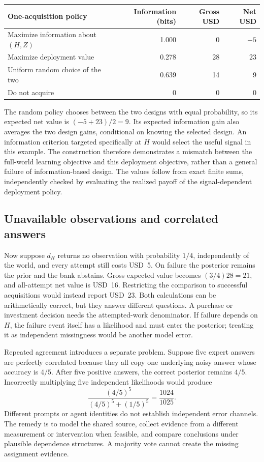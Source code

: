 \begin{center}
\begin{tabular}{lrrr}
\toprule
One-acquisition policy & Information (bits) & Gross USD & Net USD\\
\midrule
Maximize information about $(H,Z)$ & 1.000 & 0 & $-5$\\
Maximize deployment value & 0.278 & 28 & 23\\
Uniform random choice of the two & 0.639 & 14 & 9\\
Do not acquire & 0 & 0 & 0\\
\bottomrule
\end{tabular}
\end{center}

The random policy chooses between the two designs with equal probability,
so its expected net value is $(-5+23)/2=9$. Its expected information gain
also averages the two design gains, conditional on knowing the selected
design. An information criterion targeted specifically at $H$ would select
the useful signal in this example. The construction therefore demonstrates
a mismatch between the full-world learning objective and this deployment
objective, rather than a general failure of information-based design.
The values follow from exact finite sums, independently checked by evaluating
the realized payoff of the signal-dependent deployment policy.

\subsection{Unavailable observations and correlated answers}

Now suppose $d_H$ returns no observation with probability $1/4$, independently
of the world, and every attempt still costs USD~5. On failure the posterior
remains the prior and the bank abstains. Gross expected value becomes
$(3/4)28=21$, and all-attempt net value is USD~16. Restricting the comparison
to successful acquisitions would instead report USD~23. Both calculations
can be arithmetically correct, but they answer different questions. A purchase
or investment decision needs the attempted-work denominator. If failure
depends on $H$, the failure event itself has a likelihood and must enter the
posterior; treating it as independent missingness would be another model
error.

Repeated agreement introduces a separate problem. Suppose five expert
answers are perfectly correlated because they all copy one underlying noisy
answer whose accuracy is $4/5$. After five positive answers, the correct
posterior remains $4/5$. Incorrectly multiplying five independent likelihoods
would produce
\[
 \frac{(4/5)^5}{(4/5)^5+(1/5)^5}=\frac{1024}{1025}.
\]
Different prompts or agent identities do not establish independent error
channels. The remedy is to model the shared source, collect evidence from a
different measurement or intervention when feasible, and compare conclusions
under plausible dependence structures. A majority vote cannot create the
missing assignment evidence.

